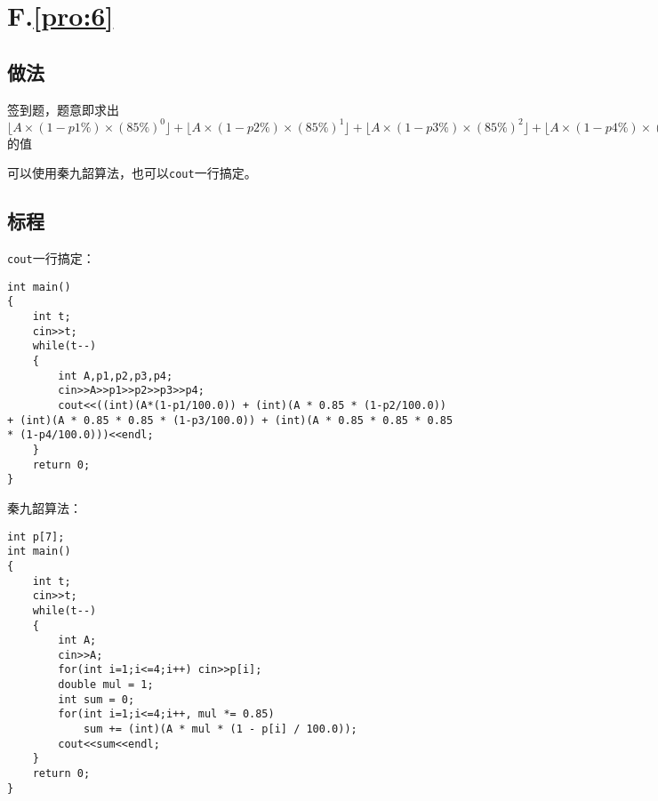 \documentclass[
	lang=cn,
	color=blue
]{elegantbook}
\begin{document}
\chapter*{F.\quad \ref*{pro:6}}
\section*{做法}
签到题，题意即求出$\lfloor A \times (1-p1\%) \times (85\%)^0 \rfloor + \lfloor A \times (1-p2\%) \times (85\%)^1 \rfloor + \lfloor A \times (1-p3\%) \times (85\%)^2 \rfloor + \lfloor A \times (1-p4\%) \times (85\%)^3 \rfloor$的值

可以使用秦九韶算法，也可以\lstinline{cout}一行搞定。

\section*{标程}
\lstinline{cout}一行搞定：
\begin{lstlisting}
int main()
{
    int t;
    cin>>t;
    while(t--)
    {
        int A,p1,p2,p3,p4;
        cin>>A>>p1>>p2>>p3>>p4;
        cout<<((int)(A*(1-p1/100.0)) + (int)(A * 0.85 * (1-p2/100.0)) + (int)(A * 0.85 * 0.85 * (1-p3/100.0)) + (int)(A * 0.85 * 0.85 * 0.85 * (1-p4/100.0)))<<endl;
    }
    return 0;
}
\end{lstlisting}

秦九韶算法：
\begin{lstlisting}
int p[7];
int main()
{
    int t;
    cin>>t;
    while(t--)
    {
        int A;
        cin>>A;
        for(int i=1;i<=4;i++) cin>>p[i];
        double mul = 1;
        int sum = 0;
        for(int i=1;i<=4;i++, mul *= 0.85)
            sum += (int)(A * mul * (1 - p[i] / 100.0));
        cout<<sum<<endl;
    }
    return 0;
}
\end{lstlisting}
\end{document}
